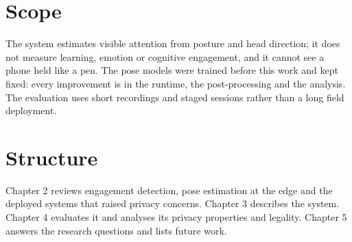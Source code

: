 \section{Scope}

The system estimates visible attention from posture and head direction; it does not measure learning, emotion or cognitive engagement, and it cannot see a phone held like a pen. The pose models were trained before this work and kept fixed: every improvement is in the runtime, the post-processing and the analysis. The evaluation uses short recordings and staged sessions rather than a long field deployment.

\section{Structure}

Chapter 2 reviews engagement detection, pose estimation at the edge and the deployed systems that raised privacy concerns. Chapter 3 describes the system. Chapter 4 evaluates it and analyses its privacy properties and legality. Chapter 5 answers the research questions and lists future work.
